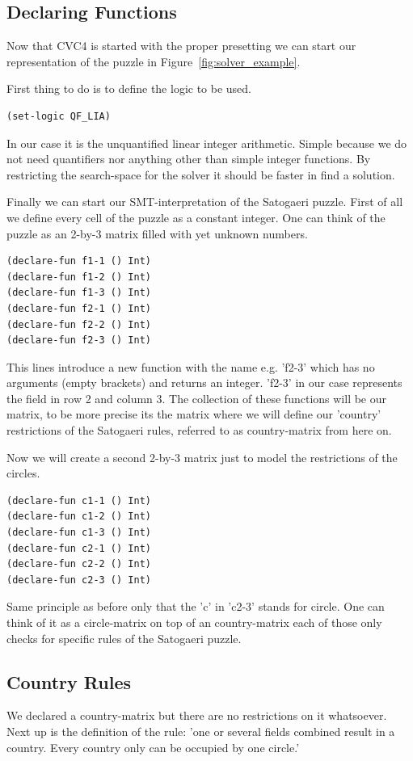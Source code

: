\subsection{Declaring Functions}
Now that CVC4 is started with the proper presetting we can start our representation of the puzzle in Figure~\ref{fig:solver_example}.

First thing to do is to define the logic to be used.
\begin{lstlisting}
(set-logic QF_LIA)
\end{lstlisting}
In our case it is the unquantified linear integer arithmetic. Simple because we do not need quantifiers nor anything other than simple integer functions. By restricting the search-space for the solver it should be faster in find a solution.

Finally we can start our SMT-interpretation of the Satogaeri puzzle. First of all we define every cell of the puzzle as a constant integer. One can think of the puzzle as an 2-by-3 matrix filled with yet unknown numbers.
\begin{lstlisting}
(declare-fun f1-1 () Int)
(declare-fun f1-2 () Int)
(declare-fun f1-3 () Int)
(declare-fun f2-1 () Int)
(declare-fun f2-2 () Int)
(declare-fun f2-3 () Int)
\end{lstlisting}
This lines introduce a new function with the name e.g. 'f2-3' which has no arguments (empty brackets) and returns an integer. 'f2-3' in our case represents the field in row 2 and column 3. The collection of these functions will be our matrix, to be more precise its the matrix where we will define our 'country' restrictions of the Satogaeri rules, referred to as country-matrix from here on.

Now we will create a second 2-by-3 matrix just to model the restrictions of the circles.
\begin{lstlisting}
(declare-fun c1-1 () Int)
(declare-fun c1-2 () Int)
(declare-fun c1-3 () Int)
(declare-fun c2-1 () Int)
(declare-fun c2-2 () Int)
(declare-fun c2-3 () Int)
\end{lstlisting}
Same principle as before only that the 'c' in 'c2-3' stands for circle.
One can think of it as a circle-matrix on top of an country-matrix each of those only checks for specific rules of the Satogaeri puzzle.

\subsection{Country Rules}
We declared a country-matrix but there are no restrictions on it whatsoever. Next up is the definition of the rule: 'one or several fields combined result in a country. Every country only can be occupied by one circle.'

